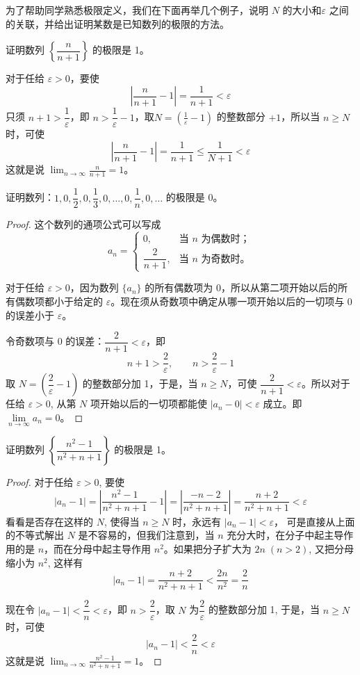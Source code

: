 \medskip
为了帮助同学熟悉极限定义，我们在下面再举几个例子，说明 $N$ 的大小和$\varepsilon$ 之间的关联，并给出证明某数是已知数列的极限的方法。

\begin{example}
  证明数列 $\left\{\dfrac{n}{n+1}\right\}$ 的极限是 1。
\end{example}

\begin{solution}
对于任给 $\varepsilon>0$，要使
\[\left|\frac{n}{n+1}-1\right|=\frac{1}{n+1}<\varepsilon\]
只须 $n+1>\dfrac{1}{\varepsilon}$，即 $n>\dfrac{1}{\varepsilon}-1$，取$N=\left(\frac{1}{\varepsilon}-1\right)$ 的整数部分 $+1$，所以当 $n\geqslant N$ 时，可使
\[\left|\frac{n}{n+1}-1\right|=\frac{1}{n+1}\le \frac{1}{N+1}<\varepsilon\]
这就是说 $\displaystyle\lim_{n\to\infty}\frac{n}{n+1}=1$。
\end{solution}

\begin{example}
  证明数列：$1,0,\dfrac{1}{2},0,\dfrac{1}{3},0,\ldots,0,\dfrac{1}{n},0,\ldots$ 的极限是 0。
\end{example}

\begin{proof}
  这个数列的通项公式可以写成
\[a_n=\begin{cases}
    0,& \text{当 $n$ 为偶数时；}\\
   \dfrac{2}{n+1},& \text{当 $n$ 为奇数时。}
\end{cases}\]

对于任给 $\varepsilon>0$，因为数列 $\{a_n\}$ 的所有偶数项为 0，所以从第二项开始以后的所有偶数项都小于给定的 $\varepsilon$。现在须从奇数项中确定从哪一项开始以后的一切项与 0 的误差小于 $\varepsilon$。 

令奇数项与 0 的误差：$\dfrac{2}{n+1}<\varepsilon$，即
\[n+1>\dfrac{2}{\varepsilon},\qquad n>\dfrac{2}{\varepsilon}-1\]  
取 $N=\left(\dfrac{2}{\varepsilon}-1\right)$ 的整数部分加 1，于是，当 $n\geqslant N$，可使 $\dfrac{2}{n+1}<\varepsilon$。所以对于任给 $\varepsilon>0$, 从第 $N$ 项开始以后的一切项都能使 $|a_n-0|<\varepsilon$ 成立。即 $\lim\limits_{n\to\infty}a_n=0$。
\end{proof}


\begin{example}\label{exp:converge2}
    证明数列 $\left\{\dfrac{n^2-1}{n^2+n+1}\right\}$ 的极限是 1。
\end{example}

\begin{proof}
对于任给 $\varepsilon>0$, 要使
\[|a_n-1|=\left|\frac{n^2-1}{n^2+n+1}-1\right|=\left|\frac{-n-2}{n^2+n+1}\right|=\frac{n+2}{n^2+n+1}<\varepsilon\]
看看是否存在这样的 $N$, 使得当 $n\geqslant N$ 时，永远有 $|a_n-1|<\varepsilon$，
可是直接从上面的不等式解出 $N$ 是不容易的，但我们注意到，当 $n$ 充分大时，在分子中起主导作用的是 $n$，而在分母中起主导作用 $n^2$。如果把分子扩大为 $2n\; (n>2)$, 又把分母缩小为 $n^2$, 这样有 \[|a_n-1|=\frac{n+2}{n^2+n+1}<\frac{2n}{n^2}=\frac{2}{n}\]

现在令 $|a_n-1|<\dfrac{2}{n}<\varepsilon$，即 $n>\dfrac{2}{\varepsilon}$，取 $N$ 为$\dfrac{2}{\varepsilon}$ 的整数部分加 1, 于是，当 $n\geqslant N$ 时，可使
\[|a_n-1|<\frac{2}{n}<\varepsilon\]
这就是说 $\displaystyle\lim_{n\to\infty}\frac{n^2-1}{n^2+n+1}=1$。
\end{proof}

